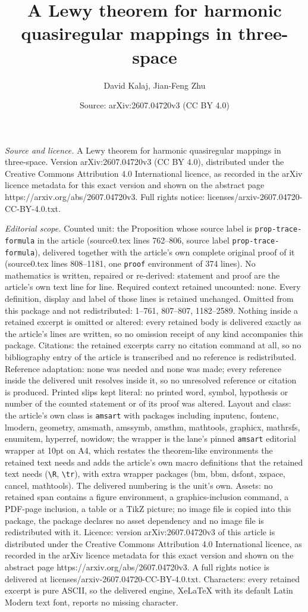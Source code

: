 \documentclass[10pt,a4paper]{amsart}
\title[A Lewy theorem for harmonic quasiregular mappings in three-s]{A Lewy theorem for harmonic quasiregular mappings in three-space}
\author{David Kalaj, Jian-Feng Zhu}
\date{Source: arXiv:2607.04720v3 (CC BY 4.0)}
\begin{document}
\maketitle

\noindent\emph{Source and licence.} A Lewy theorem for harmonic quasiregular mappings in three-space. Version arXiv:2607.04720v3 (CC BY 4.0), distributed under the Creative Commons Attribution 4.0 International licence, as recorded in the arXiv licence metadata for this exact version and shown on the abstract page https://arxiv.org/abs/2607.04720v3. Full rights notice: licenses/arxiv-2607.04720-CC-BY-4.0.txt.\par\smallskip

\noindent\textit{Editorial scope.} Counted unit: the Proposition whose source label is \texttt{prop-trace-formula} in the article (source0.tex lines 762--806, source label \texttt{prop-trace-formula}), delivered together with the article's own complete original proof of it (source0.tex lines 808--1181, one \texttt{proof} environment of 374 lines). No mathematics is written, repaired or re-derived: statement and proof are the article's own text line for line. Required context retained uncounted: none. Every definition, display and label of those lines is retained unchanged. Omitted from this package and not redistributed: 1--761, 807--807, 1182--2589. Nothing inside a retained excerpt is omitted or altered: every retained body is delivered exactly as the article's lines are written, so no omission receipt of any kind accompanies this package. Citations: the retained excerpts carry no citation command at all, so no bibliography entry of the article is transcribed and no reference is redistributed. Reference adaptation: none was needed and none was made; every reference inside the delivered unit resolves inside it, so no unresolved reference or citation is produced. Printed slips kept literal: no printed word, symbol, hypothesis or number of the counted statement or of its proof was altered. Layout and class: the article's own class is \texttt{amsart} with packages including inputenc, fontenc, lmodern, geometry, amsmath, amssymb, amsthm, mathtools, graphicx, mathrsfs, enumitem, hyperref, nowidow; the wrapper is the lane's pinned \texttt{amsart} editorial wrapper at 10pt on A4, which restates the theorem-like environments the retained text needs and adds the article's own macro definitions that the retained text needs (\texttt{\textbackslash R}, \texttt{\textbackslash tr}), with extra wrapper packages (bm, bbm, dsfont, xspace, cancel, mathtools). The delivered numbering is the unit's own. Assets: no retained span contains a figure environment, a graphics-inclusion command, a PDF-page inclusion, a table or a TikZ picture; no image file is copied into this package, the package declares no asset dependency and no image file is redistributed with it. Licence: version arXiv:2607.04720v3 of this article is distributed under the Creative Commons Attribution 4.0 International licence, as recorded in the arXiv licence metadata for this exact version and shown on the abstract page https://arxiv.org/abs/2607.04720v3. A full rights notice is delivered at licenses/arxiv-2607.04720-CC-BY-4.0.txt. Characters: every retained excerpt is pure ASCII, so the delivered engine, XeLaTeX with its default Latin Modern text font, reports no missing character.
\end{document}
